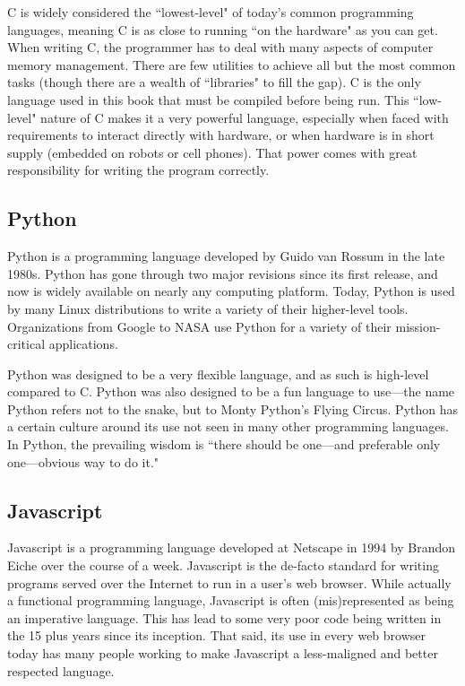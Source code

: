 C is widely considered the ``lowest-level" of today's common programming
languages, meaning C is as close to running ``on the hardware" as you can get.
When writing C, the programmer has to deal with many aspects of computer
memory management. There are few utilities to achieve all but the most common
tasks (though there are a wealth of ``libraries" to fill the gap). C is the
only language used in this book that must be compiled before being run. This
``low-level" nature of C makes it a very powerful language, especially when
faced with requirements to interact directly with hardware, or when hardware
is in short supply (embedded on robots or cell phones). That power comes with
great responsibility for writing the program correctly.

\subsection{Python}

Python is a programming language developed by Guido van Rossum in the late
1980s. Python has gone through two major revisions since its first release,
and now is widely available on nearly any computing platform. Today, Python is
used by many Linux distributions to write a variety of their higher-level
tools. Organizations from Google to NASA use Python for a variety of their
mission-critical applications.

Python was designed to be a very flexible language, and as such is high-level
compared to C. Python was also designed to be a fun language to use---the name
Python refers not to the snake, but to Monty Python's Flying Circus. Python
has a certain culture around its use not seen in many other programming
languages. In Python, the prevailing wisdom is ``there should be one---and
preferable only one---obvious way to do it."

\subsection{Javascript}

Javascript is a programming language developed at Netscape in 1994 by Brandon
Eiche over the course of a week. Javascript is the de-facto standard for
writing programs served over the Internet to run in a user's web browser.
While actually a functional programming language, Javascript is often
(mis)represented as being an imperative language. This has lead to some very
poor code being written in the 15 plus years since its inception. That said,
its use in every web browser today has many people working to make Javascript
a less-maligned and better respected language.

